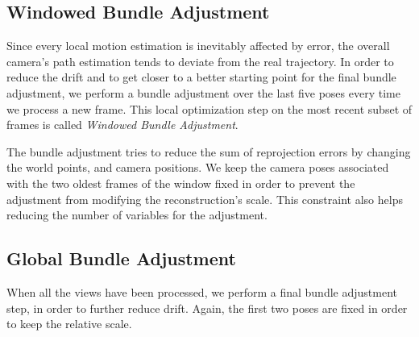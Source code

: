 \subsection{Windowed Bundle Adjustment}\label{subsec:windowed_ba}
Since every local motion estimation is inevitably affected by error, the overall 
camera's path estimation tends to deviate from the real trajectory.
In order to reduce the drift and to get closer to a better starting point 
for the final bundle adjustment, we perform a bundle adjustment over the last five poses every time we process a new frame.
This local optimization step on the most recent subset of frames is called
\textit{Windowed Bundle Adjustment}.

The bundle adjustment tries to reduce the sum of reprojection errors by changing the
world points, and camera positions. 
We keep the camera poses associated with the two oldest frames of the window 
fixed in order to prevent the adjustment from modifying the reconstruction's 
scale. This constraint also helps reducing the number of variables for the 
adjustment.

\subsection{Global Bundle Adjustment}
When all the views have been processed, we perform a final bundle adjustment 
step, in order to further reduce drift. Again, the first two poses are fixed in 
order to keep the relative scale.

